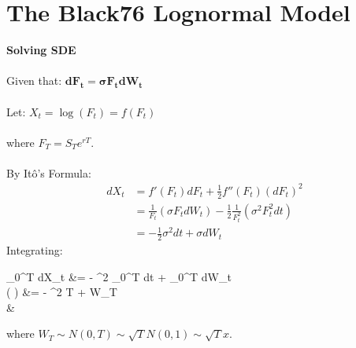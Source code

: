 \documentclass{article}
\begin{document}
\newpage


\section{The Black76 Lognormal Model}
\begin{minipage}[t]{0.5\textwidth}
\begin{tcolorbox}[height=12.4cm,boxsep=5pt,arc=0pt,auto outer arc,colback=white,colframe=black]
	\noindent \textbf{Solving SDE}\\ \\
	\noindent Given that: $\boldsymbol{dF_t = \sigma F_t dW_t}$\\ \\
	\noindent Let: $X_t = \log (F_t) = f(F_t)$\\ \\
	\noindent where $F_T = S_T e^{rT}$.\\ \\
	\noindent By Itô's Formula:
	\begin{align*}
	dX_t &= f'(F_t) dF_t + \frac{1}{2} f''(F_t) (dF_t)^2\\
	&= \frac{1}{F_t} (\sigma F_t dW_t) - \frac{1}{2} \frac{1}{F_t^2} (\sigma^2 F_t^2 dt)\\
	&= -\frac{1}{2} \sigma^2 dt + \sigma dW_t
	\end{align*}
	\noindent Integrating:
	\begin{flalign*}
	\int_{0}^{T} dX_t &= -  \sigma^2 \int_{0}^{T} dt +  \sigma \int_{0}^{T} dW_t\\
	\log \left(  \right) &= - \sigma^2 T + \sigma W_T\\
	&
	\end{flalign*}
	\noindent where $W_T \sim N(0,T) \sim \sqrt{T} N(0,1) \sim \sqrt{T} x$.
\end{tcolorbox}
\end{minipage}
\end{document}
